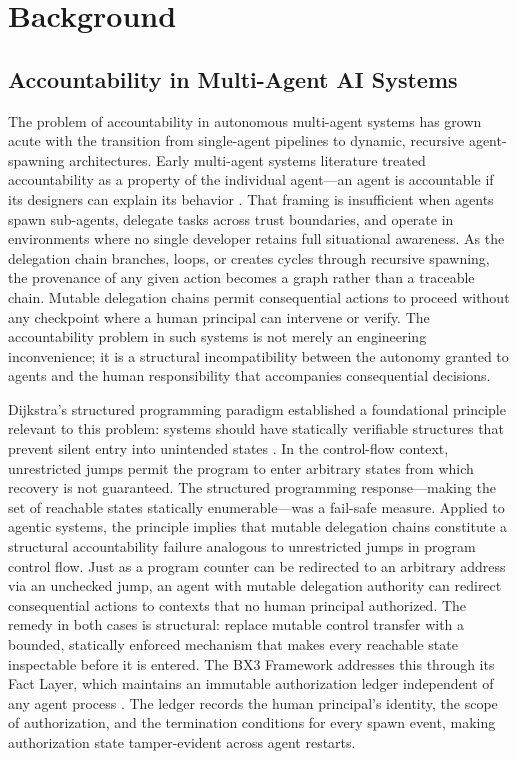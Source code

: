 \section{Background}


\subsection{Accountability in Multi-Agent AI Systems}

The problem of accountability in autonomous multi-agent systems has grown acute with the transition from single-agent pipelines to dynamic, recursive agent-spawning architectures. Early multi-agent systems literature treated accountability as a property of the individual agent---an agent is accountable if its designers can explain its behavior \cite{wooldridge1995,stone2000}. That framing is insufficient when agents spawn sub-agents, delegate tasks across trust boundaries, and operate in environments where no single developer retains full situational awareness. As the delegation chain branches, loops, or creates cycles through recursive spawning, the provenance of any given action becomes a graph rather than a traceable chain. Mutable delegation chains permit consequential actions to proceed without any checkpoint where a human principal can intervene or verify. The accountability problem in such systems is not merely an engineering inconvenience; it is a structural incompatibility between the autonomy granted to agents and the human responsibility that accompanies consequential decisions.

Dijkstra's structured programming paradigm established a foundational principle relevant to this problem: systems should have statically verifiable structures that prevent silent entry into unintended states \cite{dijkstra1982}. In the control-flow context, unrestricted jumps permit the program to enter arbitrary states from which recovery is not guaranteed. The structured programming response---making the set of reachable states statically enumerable---was a fail-safe measure. Applied to agentic systems, the principle implies that mutable delegation chains constitute a structural accountability failure analogous to unrestricted jumps in program control flow. Just as a program counter can be redirected to an arbitrary address via an unchecked jump, an agent with mutable delegation authority can redirect consequential actions to contexts that no human principal authorized. The remedy in both cases is structural: replace mutable control transfer with a bounded, statically enforced mechanism that makes every reachable state inspectable before it is entered. The BX3 Framework addresses this through its Fact Layer, which maintains an immutable authorization ledger independent of any agent process \cite{bx3framework2026}. The ledger records the human principal's identity, the scope of authorization, and the termination conditions for every spawn event, making authorization state tamper-evident across agent restarts.

